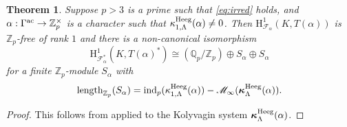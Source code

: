 \documentclass[10pt,reqno]{amsart}
\numberwithin{equation}{section}
\theoremstyle{plain}
\newtheorem{thm}{Theorem}[subsection] %
\theoremstyle{definition}
\theoremstyle{definition}
\theoremstyle{plain}
\theoremstyle{plain}
\theoremstyle{plain}
\theoremstyle{plain}
\theoremstyle{plain}
\theoremstyle{plain}
\newcommand{\Z}{\mathbb{Z}}
\newcommand{\Q}{\mathbb{Q}}
\newcommand{\Lcal}{\mathcal{L}}
\newcommand{\Fcal}{\mathcal{F}}
\newcommand{\rH}{\mathrm{H}}
\begin{document}
\begin{thm}\label{thm:kol-control}  
Suppose $p>3$ is a prime such that \eqref{eq:irred} holds,  and $\alpha:\Gamma^{\rm ac}\rightarrow\Z_p^\times$ is a character such that $\kappa_{1,\Lambda}^{\rm Heeg}(\alpha)\neq 0$. Then $\rH^1_{\Fcal_\alpha}(K,T(\alpha))$ is $\Z_p$-free of rank $1$ and there is a non-canonical isomorphism
\[
\rH^1_{\Fcal_\alpha^*}(K,T(\alpha)^*)\cong(\Q_p/\Z_p)\oplus S_\alpha\oplus S_\alpha
\]
for a finite $\Z_p$-module $S_\alpha$ with
\[
{\rm length}_{\Z_p}(S_\alpha)={\rm ind}_p(\kappa_{1,\Lambda}^{\rm Heeg}(\alpha))-
\mathscr{M}_\infty(\boldsymbol{\kappa}_\Lambda^{\rm Heeg}(\alpha)).
\]
\end{thm}

\begin{proof}
This follows from \cite[Thm.~2.2.2]{BCGS} applied to the Kolyvagin system $\boldsymbol{\kappa}_\Lambda^{\rm Heeg}(\alpha)$.
\end{proof}

\end{document}
